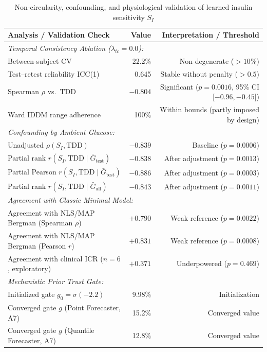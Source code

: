 \documentclass[journal]{IEEEtran}
\begin{document}
\begin{table}[t]
\centering
\caption{Non-circularity, confounding, and physiological validation of learned insulin sensitivity $S_I$}
\label{tab:si_circularity}
\footnotesize
\begin{tabular}{lrr}
\toprule
Analysis / Validation Check & Value & Interpretation / Threshold \\
\midrule
\multicolumn{3}{l}{\textit{Temporal Consistency Ablation ($\lambda_{tc} = 0.0$):}} \\
Between-subject CV & 22.2\% & Non-degenerate ($> 10\%$) \\
Test--retest reliability ICC(1) & 0.645 & Stable without penalty ($> 0.5$) \\
Spearman $\rho$ vs.\ TDD & $-0.804$ & Significant ($p=0.0016$, 95\% CI [$-0.96, -0.45$]) \\
Ward IDDM range adherence & 100\% & Within bounds (partly imposed by design) \\
\midrule
\multicolumn{3}{l}{\textit{Confounding by Ambient Glucose:}} \\
Unadjusted $\rho(S_I, \text{TDD})$ & $-0.839$ & Baseline ($p = 0.0006$) \\
Partial rank $r(S_I, \text{TDD} \mid \bar{G}_{\text{test}})$ & $-0.838$ & After adjustment ($p = 0.0013$) \\
Partial Pearson $r(S_I, \text{TDD} \mid \bar{G}_{\text{test}})$ & $-0.886$ & After adjustment ($p = 0.0003$) \\
Partial rank $r(S_I, \text{TDD} \mid \bar{G}_{\text{all}})$ & $-0.843$ & After adjustment ($p = 0.0011$) \\
\midrule
\multicolumn{3}{l}{\textit{Agreement with Classic Minimal Model:}} \\
Agreement with NLS/MAP Bergman (Spearman $\rho$) & $+0.790$ & Weak reference ($p = 0.0022$) \\
Agreement with NLS/MAP Bergman (Pearson $r$) & $+0.831$ & Weak reference ($p = 0.0008$) \\
Agreement with clinical ICR ($n=6$, exploratory) & $+0.371$ & Underpowered ($p = 0.469$) \\
\midrule
\multicolumn{3}{l}{\textit{Mechanistic Prior Trust Gate:}} \\
Initialized gate $g_0 = \sigma(-2.2)$ & 9.98\% & Initialization \\
Converged gate $g$ (Point Forecaster, A7) & 15.2\% & Converged value \\
Converged gate $g$ (Quantile Forecaster, A7) & 12.8\% & Converged value \\
\bottomrule
\end{tabular}
\end{table}
\end{document}
